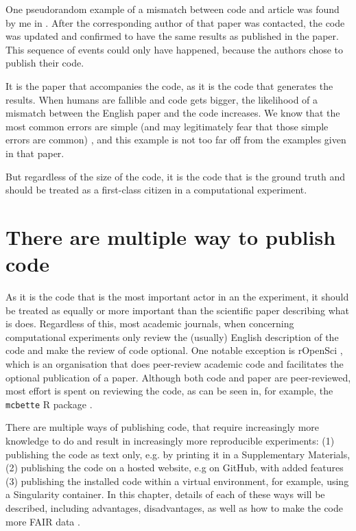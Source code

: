 One pseudorandom example of a mismatch between code and article
was found by me in \cite{labrecque2019interpretation}.
After the corresponding author of that paper was contacted,
the code was updated and confirmed to have the same
results as published in the paper.
This sequence of events could only have happened, 
because the authors chose to publish their code.

It is the paper that accompanies the code,
as it is the code that generates the results.
When humans are fallible and code gets bigger, the likelihood of
a mismatch between the English paper and the code increases.
We know that the most common errors are 
simple (and may legitimately fear that those simple errors are common) 
\cite{baggerly2009deriving},
and this example is not too far off from the
examples given in that paper.

But regardless of the size of the code, 
it is the code that is the ground truth
and should be treated as a first-class citizen
in a computational experiment.

\section{There are multiple way to publish code}

As it is the code that is the most important actor in an the experiment,
it should be treated as equally or more important than the scientific
paper describing what is does.
Regardless of this, most academic journals, 
when concerning computational experiments
only review the (usually) English description of the code
and make the review of code optional.
One notable exception is rOpenSci \cite{ram2018community},
which is an organisation that does peer-review academic code 
and facilitates the optional publication of a paper.
Although both code and paper are peer-reviewed,
most effort is spent on reviewing the code,
as can be seen in, for example, 
the \verb|mcbette| R package \cite{bilderbeek2020mcbette}.

There are multiple ways of publishing code,
that require increasingly more knowledge to do and result
in increasingly more reproducible experiments:
(1) publishing the code as text only, e.g. by printing
it in a Supplementary Materials, (2) publishing
the code on a hosted website, e.g on GitHub, with
added features (3) publishing 
the installed code within a virtual environment,
for example, using a Singularity container.
In this chapter, details of each of these ways will be described,
including advantages, disadvantages, as well as how to
make the code more FAIR data \cite{wilkinson2016fair}.

